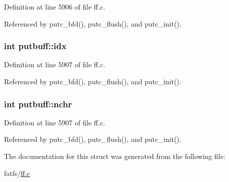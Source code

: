 Definition at line 5906 of file ff.\+c.



Referenced by putc\+\_\+bfd(), putc\+\_\+flush(), and putc\+\_\+init().

\subsubsection[{\texorpdfstring{idx}{idx}}]{\setlength{\rightskip}{0pt plus 5cm}int putbuff\+::idx}\hypertarget{structputbuff_a10a3ca93af8df07e9836ebd5230c06d8}{}\label{structputbuff_a10a3ca93af8df07e9836ebd5230c06d8}


Definition at line 5907 of file ff.\+c.



Referenced by putc\+\_\+bfd(), putc\+\_\+flush(), and putc\+\_\+init().

\subsubsection[{\texorpdfstring{nchr}{nchr}}]{\setlength{\rightskip}{0pt plus 5cm}int putbuff\+::nchr}\hypertarget{structputbuff_a125366bfe48077e6f562f95e30b4604a}{}\label{structputbuff_a125366bfe48077e6f562f95e30b4604a}


Definition at line 5907 of file ff.\+c.



Referenced by putc\+\_\+bfd(), putc\+\_\+flush(), and putc\+\_\+init().



The documentation for this struct was generated from the following file\+:\begin{DoxyCompactItemize}
\item 
fatfs/\hyperlink{ff_8c}{ff.\+c}\end{DoxyCompactItemize}
